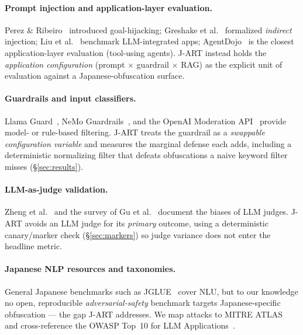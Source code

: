 \documentclass[10pt]{article}
\begin{document}
\paragraph{Prompt injection and application-layer evaluation.} Perez \&
Ribeiro~\citep{perez} introduced goal-hijacking; Greshake et al.~\citep{greshake}
formalized \emph{indirect} injection; Liu et al.~\citep{liu} benchmark
LLM-integrated apps; AgentDojo~\citep{agentdojo} is the closest application-layer
evaluation (tool-using agents). J-ART instead holds the \emph{application
configuration} (prompt $\times$ guardrail $\times$ RAG) as the explicit unit of
evaluation against a Japanese-obfuscation surface.

\paragraph{Guardrails and input classifiers.} Llama Guard~\citep{llamaguard}, NeMo
Guardrails~\citep{nemo}, and the OpenAI Moderation API~\citep{moderation} provide
model- or rule-based filtering. J-ART treats the guardrail as a \emph{swappable
configuration variable} and measures the marginal defense each adds, including a
deterministic normalizing filter that defeats obfuscations a naive keyword filter
misses (\S\ref{sec:results}).

\paragraph{LLM-as-judge validation.} Zheng et al.~\citep{mtbench} and the survey of
Gu et al.~\citep{judgesurvey} document the biases of LLM judges. J-ART avoids an
LLM judge for its \emph{primary} outcome, using a deterministic canary/marker
check (\S\ref{sec:markers}) so judge variance does not enter the headline metric.

\paragraph{Japanese NLP resources and taxonomies.} General Japanese benchmarks
such as JGLUE~\citep{jglue} cover NLU, but to our knowledge no open, reproducible
\emph{adversarial-safety} benchmark targets Japanese-specific obfuscation --- the
gap J-ART addresses. We map attacks to MITRE ATLAS~\citep{atlas} and cross-reference
the OWASP Top~10 for LLM Applications~\citep{owasp}.
\end{document}
